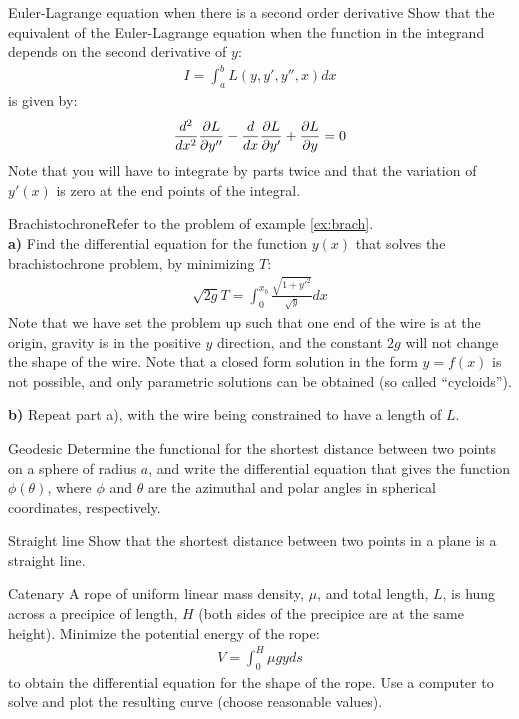 \begin{problem}{Euler-Lagrange equation when there is a second order derivative}\label{prob_CalcVar_4} Show that the equivalent of the Euler-Lagrange equation when the function in the integrand depends on the second derivative of $y$:
\begin{align*}
I=\int_a^b L(y,y',y'',x)dx
\end{align*}
is given by:
\begin{align*}
\frac{d^2}{dx^2}\frac{\partial L}{\partial y''}-\frac{d}{dx}\frac{\partial L}{\partial y'}+\frac{\partial L}{\partial y}=0
\end{align*}
Note that you will have to integrate by parts twice and that the variation of $y'(x)$ is zero at the end points of the integral.
\end{problem}

\begin{problem}{Brachistochrone}\label{prob_CalcVar_5}Refer to the problem of example \ref{ex:brach}.\\
\textbf{a)} Find the differential equation for the function $y(x)$ that solves the brachistochrone problem, by minimizing $T$:
\begin{align*}
\sqrt{2g}T=\int_0^{x_b} \frac{\sqrt{1+y'^2}}{\sqrt{y}}dx
\end{align*}
Note that we have set the problem up such that one end of the wire is at the origin, gravity is in the positive $y$ direction, and the constant $2g$ will not change the shape of the wire. Note that a closed form solution in the form $y=f(x)$ is not possible, and only parametric solutions can be obtained (so called ``cycloids'').

\textbf{b)} Repeat part a), with the wire being constrained to have a length of $L$.
\end{problem}

\begin{problem}{Geodesic}\label{prob_CalcVar_6} Determine the functional for the shortest distance between two points on a sphere of radius $a$, and write the differential equation that gives the function $\phi(\theta)$, where $\phi$ and $\theta$ are the azimuthal and polar angles in spherical coordinates, respectively.
\end{problem}

\begin{problem}{Straight line}\label{prob_CalcVar_7} Show that the shortest distance between two points in a plane is a straight line.
\end{problem}

\begin{problem}{Catenary}\label{prob_CalcVar_8} A rope of uniform linear mass density, $\mu$, and total length, $L$, is hung across a precipice of length, $H$ (both sides of the precipice are at the same height). Minimize the potential energy of the rope:
\begin{align*}
V=\int_0^H \mu g y ds
\end{align*} 
to obtain the differential equation for the shape of the rope. Use a computer to solve and plot the resulting curve (choose reasonable values).
\end{problem}


